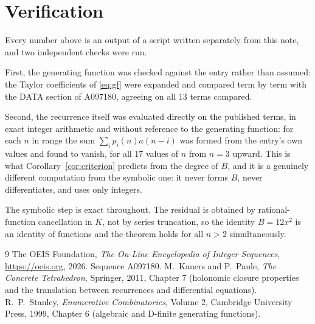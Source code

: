 \documentclass[11pt,a4paper]{article}
\theoremstyle{plain}
\theoremstyle{definition}
\begin{document}
\section{Verification}

Every number above is an output of a script written separately from this note, and two
independent checks were run.

First, the generating function was checked against the entry rather than assumed: the
Taylor coefficients of \eqref{eq:gf} were expanded and compared term by term with the DATA
section of A097180, agreeing on all 13 terms compared.

Second, the recurrence itself was evaluated directly on the published terms, in exact
integer arithmetic and without reference to the generating function: for each $n$ in range
the sum $\sum_{i}p_{i}(n)a(n-i)$ was formed from the entry's own values and found to
vanish, for all 17 values of $n$ from $n=3$ upward. This is what
Corollary~\ref{cor:criterion} predicts from the degree of $B$, and it is a genuinely
different computation from the symbolic one: it never forms $B$, never differentiates, and
uses only integers.

The symbolic step is exact throughout. The residual is obtained by rational-function
cancellation in $K$, not by series truncation, so the identity $B=12 x^{2}$ is an
identity of functions and the theorem holds for all $n>2$ simultaneously.

\begin{thebibliography}{9}
 The OEIS Foundation, \emph{The On-Line Encyclopedia of Integer Sequences},
\url{https://oeis.org}, 2026. Sequence A097180.
 M.~Kauers and P.~Paule, \emph{The Concrete Tetrahedron}, Springer, 2011,
Chapter 7 (holonomic closure properties and the translation between recurrences and
differential equations).
 R.~P.~Stanley, \emph{Enumerative Combinatorics}, Volume 2, Cambridge
University Press, 1999, Chapter 6 (algebraic and D-finite generating functions).
\end{thebibliography}
\end{document}
